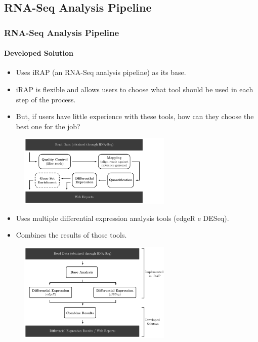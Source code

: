 \documentclass[xcolor=dvipsnames]{beamer}
\begin{document}
\subsection{RNA-Seq Analysis Pipeline}
\begin{frame}[allowframebreaks]
  \frametitle{RNA-Seq Analysis Pipeline}
  \framesubtitle{Developed Solution}

\begin{itemize}
\item
Uses iRAP (an RNA-Seq analysis pipeline) as its base.

\item
iRAP is flexible and allows users to choose what tool should be used in each
step of the process.

\item
But, if users have little experience with these tools, how can they choose the
best one for the job?
\end{itemize}

\begin{figure}
  \centering
  \includegraphics[width=0.65\textwidth]{irap}
\end{figure}

\framebreak

\begin{itemize}\small
\item
Uses multiple differential expression analysis tools (edgeR e DESeq).

\item
Combines the results of those tools.
\end{itemize}

\begin{figure}
  \centering
  \includegraphics[width=0.65\textwidth]{tool1}
\end{figure}


\end{frame}
\end{document}
